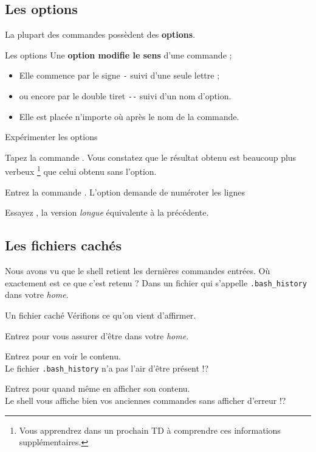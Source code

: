 \documentclass[a4paper,11pt]{style-esi/td}
\begin{document}
	\subsection{Les options}
	
		La plupart des commandes possèdent des \textbf{options}.

		\begin{theorie}{Les options}
			Une \textbf{option modifie le sens} d'une commande ;
			\begin{itemize}
			\item Elle commence par le signe \texttt{-} suivi d'une seule lettre ;
			\item ou encore par le double tiret \texttt{-{}-} suivi d'un nom d'option.
			\item Elle est placée n'importe où après le nom de la commande.   
			\end{itemize}
		\end{theorie}		

		\begin{Experience}{Expérimenter les options}		
			\vspace{-1em}
			\begin{steps}
			\item Tapez la commande . 
				Vous constatez que le résultat obtenu est beaucoup plus verbeux%
				\footnote{%
					Vous apprendrez dans un prochain TD 
					à comprendre ces informations supplémentaires.
				} 
				que celui obtenu sans l'option.
			\item Entrez la commande . 
				L'option demande de numéroter les lignes 
			\item Essayez ,
				la version \textit{longue} équivalente à la précédente.
			\end{steps}
		\end{Experience}

	\subsection{Les fichiers cachés}

		Nous avons vu que le shell retient les dernières commandes entrées.
		Où exactement est ce que c'est retenu ?
		Dans un fichier qui s'appelle \verb|.bash_history| dans votre \emph{home}.

		\begin{Experience}{Un fichier caché}
			Vérifions ce qu'on vient d'affirmer.
			\begin{steps}
			\item Entrez  pour vous assurer d'être dans votre \emph{home}.
			\item Entrez  pour en voir le contenu.
				\\Le fichier \verb|.bash_history| n'a pas l'air d'être présent !?
			\item Entrez  pour quand même en afficher son contenu.
				\\Le shell vous affiche bien vos anciennes commandes sans afficher d'erreur !?
			\end{steps}
		\end{Experience}
\end{document}
